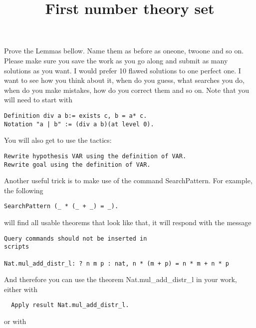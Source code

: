 \documentclass[11pt, oneside]{article}   	%
\title{First number theory set}
\author{}
\date{}							%
\begin{document}
\maketitle

\newtheorem{axiom}{Axiom}
\newtheorem{lemma}{Lemma}
\newtheorem{definition}{Definition}

\newtheorem{puzzle}{Puzzle}

Prove the Lemmas bellow. Name them as before as oneone,  twoone and so on. Please make sure you save the work as you go along and submit as many solutions as you want. I would prefer 10  flawed solutions to one perfect one. I want to see how you think about it, when do you guess, what searches you do, when do you make mistakes, how do you correct them and so on.
Note that you will need to start with
\begin{verbatim}
Definition div a b:= exists c, b = a* c.
Notation "a | b" := (div a b)(at level 0).
\end{verbatim}

You will also get to use the tactics:
\begin{verbatim}
Rewrite hypothesis VAR using the definition of VAR.
Rewrite goal using the definition of VAR.
\end{verbatim}


Another useful trick is to make use of the  command SearchPattern. For example, the following

\begin{verbatim}
SearchPattern (_ * (_ + _) = _).
\end{verbatim}
will find all usable theorems that look like that, it will respond with the message

\begin{verbatim}
Query commands should not be inserted in
scripts

Nat.mul_add_distr_l: ? n m p : nat, n * (m + p) = n * m + n * p
\end{verbatim}
 And therefore you can use the theorem Nat.mul\_add\_distr\_l in your work, either with 
 \begin{verbatim}
  Apply result Nat.mul_add_distr_l.
 \end{verbatim}
  or with
  
\end{document}
